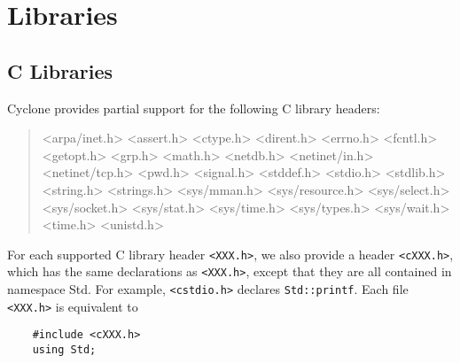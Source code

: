 \section{Libraries}

\ifscreen
{}
\else
{}
\fi

\subsection{C Libraries}
Cyclone provides partial support for the following C library headers:
\begin{quote}\ttfamily
  <arpa/inet.h>
  <assert.h>
  <ctype.h>
  <dirent.h>
  <errno.h>
  <fcntl.h>
  <getopt.h>
  <grp.h>
  <math.h>
  <netdb.h>
  <netinet/in.h>
  <netinet/tcp.h>
  <pwd.h>
  <signal.h>
  <stddef.h>
  <stdio.h>
  <stdlib.h>
  <string.h>
  <strings.h>
  <sys/mman.h>
  <sys/resource.h>
  <sys/select.h>
  <sys/socket.h>
  <sys/stat.h>
  <sys/time.h>
  <sys/types.h>
  <sys/wait.h>
  <time.h>
  <unistd.h>
\end{quote}

For each supported C library header \texttt{<XXX.h>}, we also provide
a header \texttt{<cXXX.h>}, which has the same declarations as
\texttt{<XXX.h>}, except that they are all contained in namespace Std.
For example, \texttt{<cstdio.h>} declares \texttt{Std::printf}.  Each
file \texttt{<XXX.h>} is equivalent to
\begin{verbatim}
    #include <cXXX.h>
    using Std;
\end{verbatim}



